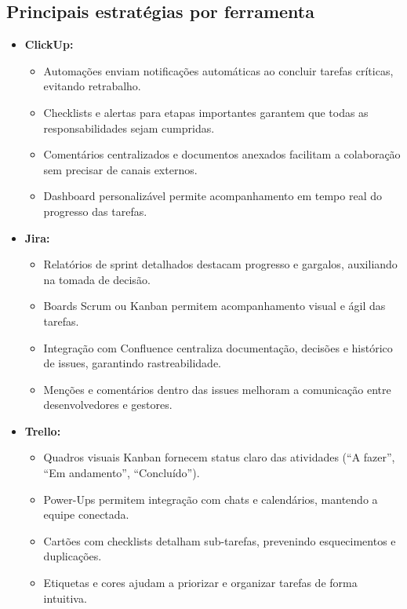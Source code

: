 \documentclass[12pt]{article}
\begin{document}
\subsection*{Principais estratégias por ferramenta}

\begin{itemize}
    \item \textbf{ClickUp:} 
    \begin{itemize}
        \item Automações enviam notificações automáticas ao concluir tarefas críticas, evitando retrabalho.
        \item Checklists e alertas para etapas importantes garantem que todas as responsabilidades sejam cumpridas.
        \item Comentários centralizados e documentos anexados facilitam a colaboração sem precisar de canais externos.
        \item Dashboard personalizável permite acompanhamento em tempo real do progresso das tarefas.
    \end{itemize}

    \item \textbf{Jira:}
    \begin{itemize}
        \item Relatórios de sprint detalhados destacam progresso e gargalos, auxiliando na tomada de decisão.
        \item Boards Scrum ou Kanban permitem acompanhamento visual e ágil das tarefas.
        \item Integração com Confluence centraliza documentação, decisões e histórico de issues, garantindo rastreabilidade.
        \item Menções e comentários dentro das issues melhoram a comunicação entre desenvolvedores e gestores.
    \end{itemize}

    \item \textbf{Trello:}
    \begin{itemize}
        \item Quadros visuais Kanban fornecem status claro das atividades (“A fazer”, “Em andamento”, “Concluído”).
        \item Power-Ups permitem integração com chats e calendários, mantendo a equipe conectada.
        \item Cartões com checklists detalham sub-tarefas, prevenindo esquecimentos e duplicações.
        \item Etiquetas e cores ajudam a priorizar e organizar tarefas de forma intuitiva.
    \end{itemize}
\end{itemize}
\end{document}
